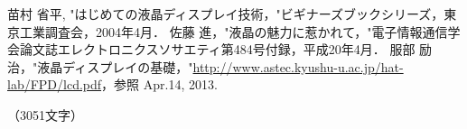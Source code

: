 \documentclass[dvipdfmx,uplatex]{jsarticle}
\begin{document}
\begin{thebibliography}{100}
     苗村 省平, "はじめての液晶ディスプレイ技術，"ビギナーズブックシリーズ，東京工業調査会，2004年4月．
     佐藤 進，"液晶の魅力に惹かれて，"電子情報通信学会論文誌エレクトロニクスソサエティ第484号付録，平成20年4月．
     服部 励治，"液晶ディスプレイの基礎，"\url{http://www.astec.kyushu-u.ac.jp/hat-lab/FPD/lcd.pdf}，参照 Apr.14, 2013.
\end{thebibliography}

\begin{flushright}
	（3051文字）
\end{flushright}

\end{document}

